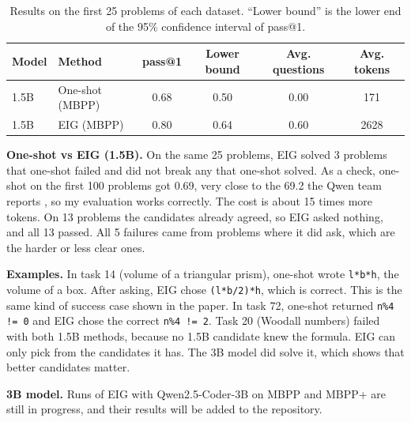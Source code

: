 \documentclass[11pt]{article}
\newif\ifthreeB
\newcommand{\mbppAcc}{0.84}
\newcommand{\mbppCI}{0.70}
\newcommand{\mbppQ}{0.56}
\newcommand{\mbppTok}{3076}
\newcommand{\plusAcc}{0.88}
\newcommand{\plusCI}{0.75}
\newcommand{\plusQ}{0.56}
\newcommand{\plusTok}{2994}
\begin{document}
\begin{table}[H]
\centering
\small
\begin{tabular}{llcccc}
\toprule
Model & Method & pass@1 & Lower bound & Avg. questions & Avg. tokens \\
\midrule
1.5B & One-shot (MBPP) & 0.68 & 0.50 & 0.00 & 171 \\
1.5B & EIG (MBPP)      & 0.80 & 0.64 & 0.60 & 2628 \\
\ifthreeB
\midrule
3B   & EIG (MBPP)      & \mbppAcc & \mbppCI & \mbppQ & \mbppTok \\
3B   & EIG (MBPP+)     & \plusAcc & \plusCI & \plusQ & \plusTok \\
\fi
\bottomrule
\end{tabular}
\caption{Results on the first 25 problems of each dataset. ``Lower bound'' is the lower end of the 95\% confidence interval of pass@1.}
\end{table}

\textbf{One-shot vs EIG (1.5B).} On the same 25 problems, EIG solved 3 problems that one-shot failed and did not break any that one-shot solved. As a check, one-shot on the first 100 problems got 0.69, very close to the 69.2 the Qwen team reports , so my evaluation works correctly. The cost is about 15 times more tokens. On 13 problems the candidates already agreed, so EIG asked nothing, and all 13 passed. All 5 failures came from problems where it did ask, which are the harder or less clear ones.

\textbf{Examples.} In task 14 (volume of a triangular prism), one-shot wrote \texttt{l*b*h}, the volume of a box. After asking, EIG chose \texttt{(l*b/2)*h}, which is correct. This is the same kind of success case shown in the paper. In task 72, one-shot returned \texttt{n\%4 != 0} and EIG chose the correct \texttt{n\%4 != 2}. Task 20 (Woodall numbers) failed with both 1.5B methods, because no 1.5B candidate knew the formula. EIG can only pick from the candidates it has. The 3B model did solve it, which shows that better candidates matter.

\ifthreeB
\textbf{3B model.} I did not run one-shot with 3B, so these rows show how EIG does with a bigger model, not a gain over one-shot. On the same 25 MBPP problems, EIG with 3B got 0.84 against 0.80 with 1.5B: it solved 3 problems the smaller model missed and missed 2 that it solved. MBPP+ scored higher (0.88) even though its tests are stronger. This is because the first 25 MBPP+ problems are not the same set: 7 of them (tasks 2 to 9) are not in my MBPP list and are easy ones, and 6 of these 7 passed. On the 18 problems that are in both lists, EIG with 3B passed 16 on MBPP and also 16 on MBPP+, so the extra MBPP+ tests did not catch any new mistakes.
\else
\textbf{3B model.} Runs of EIG with Qwen2.5-Coder-3B on MBPP and MBPP+ are still in progress, and their results will be added to the repository.
\fi
\end{document}
